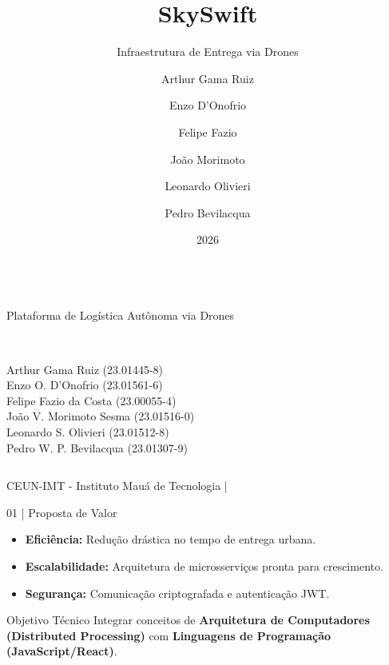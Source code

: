 \documentclass[aspectratio=169,12pt]{beamer}
\title{\textbf{SkySwift}}
\subtitle{Infraestrutura de Entrega via Drones}
\author{Arthur Gama Ruiz \and Enzo D'Onofrio \and Felipe Fazio \and Jo\~ao Morimoto \and Leonardo Olivieri \and Pedro Bevilacqua}
\institute{CEUN-IMT - Instituto Mauá de Tecnologia}
\date{2026}
\begin{document}

{
\begin{frame}[plain]
  
  \centering
  \vspace{1 cm}
  {\Huge \textbf{\textcolor{White}{SkySwift}}} \\
  \vspace{0.2cm}
  {\large \textcolor{AccentBlue}{Plataforma de Logística Autônoma via Drones}} \\
  
  \vfill
  
  \begin{columns}[T]
      \scriptsize
      \textbf{\textcolor{White}{Desenvolvimento:}} \\
      Arthur Gama Ruiz (23.01445-8) \\
      Enzo O. D’Onofrio (23.01561-6) \\
      Felipe Fazio da Costa (23.00055-4)
      \scriptsize
      \textbf{\textcolor{White}{\phantom{Desenvolvimento:}}} \\
      João V. Morimoto Sesma (23.01516-0) \\
      Leonardo S. Olivieri (23.01512-8) \\
      Pedro W. P. Bevilacqua (23.01307-9)
  \end{columns}
  
  \vfill
  
  {\tiny \textcolor{TextGray}{CEUN-IMT - Instituto Mauá de Tecnologia \quad | }}
\end{frame}
}

\begin{frame}{01 | Proposta de Valor}
  \begin{itemize}
    \item \textbf{\textcolor{AccentBlue}{Eficiência:}} Redução drástica no tempo de entrega urbana.
    \item \textbf{\textcolor{AccentBlue}{Escalabilidade:}} Arquitetura de microsserviços pronta para crescimento.
    \item \textbf{\textcolor{AccentBlue}{Segurança:}} Comunicação criptografada e autenticação JWT.
  \end{itemize}
  \vfill
  \begin{block}{Objetivo Técnico}
    Integrar conceitos de \textbf{Arquitetura de Computadores (Distributed Processing)} com \textbf{Linguagens de Programação (JavaScript/React)}.
  \end{block}
\end{frame}
\end{document}
